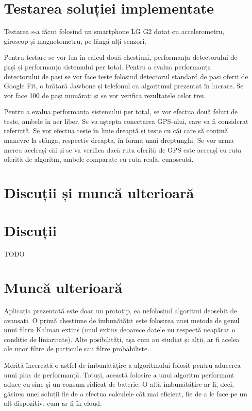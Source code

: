 \documentclass[12pt, a4paper, oneside]{article}
\begin{document}
\newpage
\section{Testarea soluției implementate} \label{TestareAplicatie}
Testarea s-a făcut folosind un smartphone LG G2 dotat cu accelerometru, giroscop și magnetometru, pe lângă alți senzori.

Pentru testare se vor lua în calcul două chestiuni, performanța detectorului de pași și performanța sistemului per total. Pentru a evalua performanța detectorului de pași se vor face teste folosind detectorul standard de pași oferit de Google Fit, o brățară Jawbone și telefonul cu algoritmul prezentat în lucrare. Se vor face 100 de pași numărați și se vor verifica rezultatele celor trei.

Pentru a evalua performanța sistemului per total, se vor efectua două feluri de teste, ambele în aer liber. Se va aștepta conectarea GPS-ului, care va fi considerat referință. Se vor efectua teste în linie dreaptă și teste cu căi care să conțină manevre la stânga, respectiv dreapta, în forma unui dreptunghi. Se vor urma mereu aceleași căi și se va verifica dacă ruta oferită de GPS este aceeași cu ruta oferită de algoritm, ambele comparate cu ruta reală, cunoscută.


\newpage
\section{Discuții și muncă ulterioară} \label{DiscutiiMuncaUlterioara}
\section{Discuții} \label{Discutii}
TODO


\section{Muncă ulterioară} \label{MuncaUlterioara}
Aplicația prezentată este doar un prototip, ea nefolosind algoritmi deosebit de avansați. O primă chestiune de îmbunătățit este folosirea unei metode de genul unui filtru Kalman extins (unul extins deoarece datele nu respectă neapărat o condiție de liniaritate). Alte posibilități, așa cum au studiat și alții, ar fi acelea ale unor filtre de particule sau filtre probabiliste.

Merită încercată o astfel de îmbunătățire a algoritmului folosit pentru aducerea unui plus de performanță. Totuși, această folosire a unui algoritm performant aduce cu sine și un consum ridicat de baterie. O altă îmbunătățire ar fi, deci, găsirea unei soluții fie de a efectua calculele cât mai eficient, fie de a le face pe un alt dispozitiv, cum ar fi în cloud.
\end{document}
